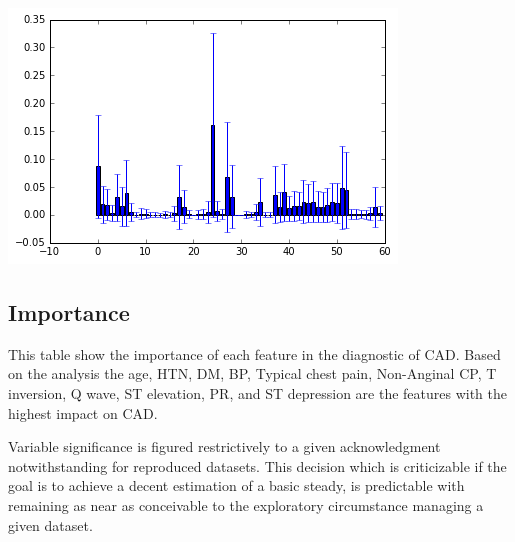 \documentclass[sigconf]{acmart}
\begin{document}
\includegraphics[width=0.95\columnwidth]{images/output_17_0.png}



\subsection{Importance}

This table show the importance of each feature in the diagnostic of CAD. Based on the analysis the age, HTN,  DM, BP, Typical chest pain, Non-Anginal  CP, T  inversion, Q  wave,  ST elevation, PR, and ST depression are the features with the highest impact on CAD.

Variable significance is figured restrictively to a given acknowledgment notwithstanding for reproduced datasets. This decision which is criticizable if the goal is to achieve a decent estimation of a basic steady, is predictable with remaining as near as conceivable to the exploratory circumstance managing a given dataset\cite{GENUER20102225}.
\end{document}
